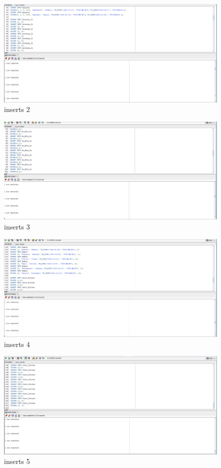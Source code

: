 \documentclass[12pt]{article}
\begin{document}
\begin{figure}[!htb]
\includegraphics[max width=\linewidth]{imgs/inserts2.png}
\caption{inserts 2}
\label{fig:inserts 2}
\end{figure}
\begin{figure}[!htb]
\includegraphics[max width=\linewidth]{imgs/inserts3.png}
\caption{inserts 3}
\label{fig:inserts 3}
\end{figure}
\begin{figure}[!htb]
\includegraphics[max width=\linewidth]{imgs/inserts4.png}
\caption{inserts 4}
\label{fig:inserts 4}
\end{figure}
\begin{figure}[!htb]
\includegraphics[max width=\linewidth]{imgs/inserts5.png}
\caption{inserts 5}
\label{fig:inserts 5}
\end{figure}
\end{document}
